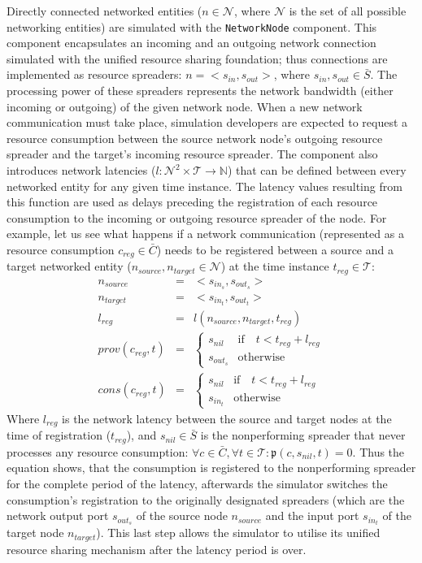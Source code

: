 \documentclass[sort, compress, 5p]{elsarticle}
\newcommand{\SIMULATIONTIMEM}{\mathcal{T}}
\begin{document}
Directly connected networked entities ($n\in \mathcal{N}$, where $\mathcal{N}$ is the set of all possible networking entities) are simulated with the \verb+NetworkNode+ component. This component encapsulates an incoming and an outgoing network connection simulated with the unified resource sharing foundation; thus connections are implemented as resource spreaders: $n=<s_{in},s_{out}>$, where $s_{in},s_{out}\in\bar{S}$. The processing power of these spreaders represents the network bandwidth (either incoming or outgoing) of the given network node. When a new network communication must take place, simulation developers are expected to request a resource consumption between the source network node's outgoing resource spreader and the target's incoming resource spreader. The component also introduces network latencies ($l:\mathcal{N}^2\times \SIMULATIONTIMEM\to\mathbb{N}$) that can be defined between every networked entity for any given time instance. The latency values resulting from this function are used as delays preceding the registration of each resource consumption to the incoming or outgoing resource spreader of the node. For example, let us see what happens if a network communication (represented as a resource consumption $c_{reg}\in\bar{C}$) needs to be registered between a source and a target networked entity ($n_{source}, n_{target}\in \mathcal{N}$)  at the time instance $t_{reg}\in\SIMULATIONTIMEM$:
\begin{eqnarray}
n_{source}&=&<s_{in_s},s_{out_s}>\\
n_{target}&=&<s_{in_t},s_{out_t}>\\
l_{reg}&=&l(n_{source},n_{target},t_{reg})\\
prov(c_{reg},t)&=&\left\{\begin{array}{ll}
s_{nil} & \mathrm{if}\quad t<t_{reg}+l_{reg}\\
s_{out_s} & \mathrm{otherwise}
\end{array}\right.
\\
cons(c_{reg},t)&=&\left\{\begin{array}{ll}
s_{nil} & \mathrm{if}\quad t<t_{reg}+l_{reg}\\
s_{in_t} & \mathrm{otherwise}
\end{array}\right.
\end{eqnarray}
Where $l_{reg}$ is the network latency between the source and target nodes at the time of registration ($t_{reg}$), and $s_{nil}\in\bar{S}$ is the nonperforming spreader that never processes any resource consumption: $\forall c\in\bar{C}, \forall t\in\SIMULATIONTIMEM:\mathfrak{p}(c,s_{nil},t)=0$. Thus the equation shows, that the consumption is registered to the nonperforming spreader for the complete period of the latency, afterwards the simulator switches the consumption's registration to the originally designated spreaders (which are the network output port $s_{out_s}$ of the source node $n_{source}$ and the input port $s_{in_t}$ of the target node $n_{target}$). This last step allows the simulator to utilise its unified resource sharing mechanism after the latency period is over.
\end{document}
